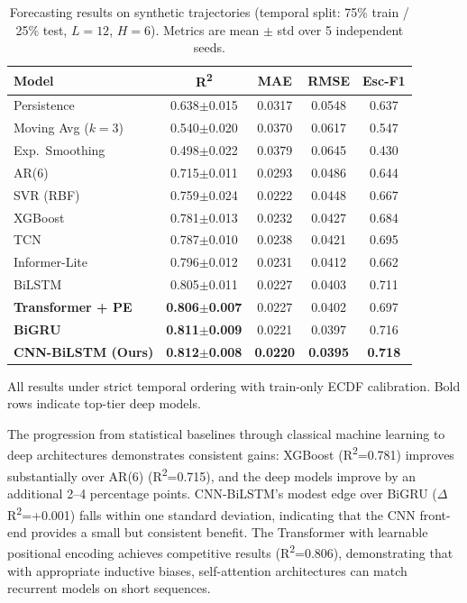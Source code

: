 \documentclass[11pt,a4paper]{article}
\begin{document}
\begin{table}[h]
\caption{Forecasting results on synthetic trajectories (temporal split: 75\% train / 25\% test, $L{=}12$, $H{=}6$). Metrics are mean $\pm$ std over 5 independent seeds.}
\label{tab:results}
\centering
\begin{tabular}{lcccc}
\toprule
\textbf{Model} & \textbf{R\textsuperscript{2}} & \textbf{MAE} & \textbf{RMSE} & \textbf{Esc-F1} \\
\midrule
Persistence            & 0.638$\pm$0.015 & 0.0317 & 0.0548 & 0.637 \\
Moving Avg ($k{=}3$)   & 0.540$\pm$0.020 & 0.0370 & 0.0617 & 0.547 \\
Exp.\ Smoothing        & 0.498$\pm$0.022 & 0.0379 & 0.0645 & 0.430 \\
AR(6)                  & 0.715$\pm$0.011 & 0.0293 & 0.0486 & 0.644 \\
SVR (RBF)              & 0.759$\pm$0.024 & 0.0222 & 0.0448 & 0.667 \\
XGBoost                & 0.781$\pm$0.013 & 0.0232 & 0.0427 & 0.684 \\
TCN                    & 0.787$\pm$0.010 & 0.0238 & 0.0421 & 0.695 \\
Informer-Lite          & 0.796$\pm$0.012 & 0.0231 & 0.0412 & 0.662 \\
BiLSTM                 & 0.805$\pm$0.011 & 0.0227 & 0.0403 & 0.711 \\
\textbf{Transformer + PE}  & \textbf{0.806}$\pm$\textbf{0.007} & 0.0227 & 0.0402 & 0.697 \\
\textbf{BiGRU}             & \textbf{0.811}$\pm$\textbf{0.009} & 0.0221 & 0.0397 & 0.716 \\
\textbf{CNN-BiLSTM (Ours)} & \textbf{0.812}$\pm$\textbf{0.008} & \textbf{0.0220} & \textbf{0.0395} & \textbf{0.718} \\
\bottomrule
\end{tabular}
\vspace{4pt}
\footnotesize{All results under strict temporal ordering with train-only ECDF calibration. Bold rows indicate top-tier deep models.}
\end{table}

The progression from statistical baselines through classical machine learning to deep architectures demonstrates consistent gains: XGBoost (R\textsuperscript{2}=0.781) improves substantially over AR(6) (R\textsuperscript{2}=0.715), and the deep models improve by an additional 2--4 percentage points. CNN-BiLSTM's modest edge over BiGRU ($\Delta$R\textsuperscript{2}=+0.001) falls within one standard deviation, indicating that the CNN front-end provides a small but consistent benefit. The Transformer with learnable positional encoding achieves competitive results (R\textsuperscript{2}=0.806), demonstrating that with appropriate inductive biases, self-attention architectures can match recurrent models on short sequences.
\end{document}
